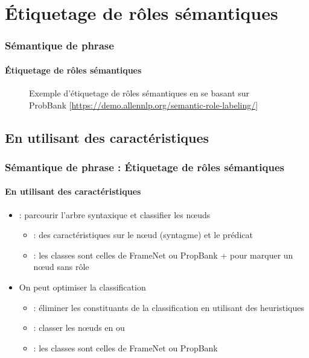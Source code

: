 \documentclass[xcolor=table]{beamer}
\begin{document}
\section{Étiquetage de rôles sémantiques}

\begin{frame}
\frametitle{Sémantique de phrase}
\framesubtitle{Étiquetage de rôles sémantiques}

\begin{figure}
	\caption{Exemple d'étiquetage de rôles sémantiques en se basant sur ProbBank [\url{https://demo.allennlp.org/semantic-role-labeling/}]}
\end{figure}
	
\end{frame}

\subsection{En utilisant des caractéristiques}

\begin{frame}
	\frametitle{Sémantique de phrase : Étiquetage de rôles sémantiques}
	\framesubtitle{En utilisant des caractéristiques}
	
	\begin{itemize}
		\item {} : parcourir l'arbre syntaxique et classifier les nœuds
		\begin{itemize}
			\item {} : des caractéristiques sur le nœud (syntagme) et le prédicat 
			\item {} : les classes sont celles de FrameNet ou PropBank +  pour marquer un nœud sans rôle 
		\end{itemize} 
		\item On peut optimiser la classification
		\begin{itemize}
			\item {} : éliminer les constituants de la classification en utilisant des heuristiques
			\item {} : classer les nœuds en  ou 
			\item {} : les classes sont celles de FrameNet ou PropBank
		\end{itemize} 
	\end{itemize}
	
\end{frame}
\end{document}

